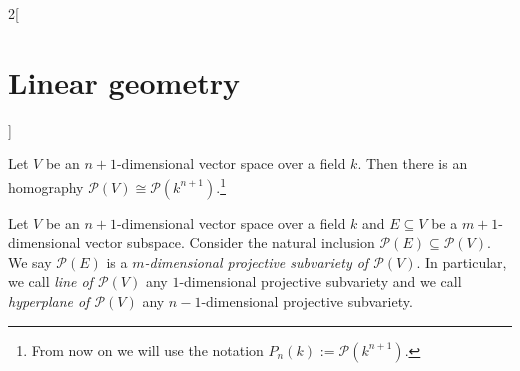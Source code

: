 \documentclass[class=article,10pt,crop=false]{standalone}
\begin{document}
\begin{multicols}{2}[\section{Linear geometry}]
\begin{definition}
\end{definition}
\begin{prop}
Let $V$ be an $n+1$-dimensional vector space over a field $k$. Then there is an homography $\mathcal{P}(V)\cong \mathcal{P}(k^{n+1})$.\footnote{From now on we will use the notation $P_n(k):=\mathcal{P}(k^{n+1})$.}
\end{prop}
\begin{definition}
Let $V$ be an $n+1$-dimensional vector space over a field $k$ and $E\subseteq V$ be a $m+1$-dimensional vector subspace. Consider the natural inclusion $\mathcal{P}(E)\subseteq\mathcal{P}(V)$. We say $\mathcal{P}(E)$ is a \textit{$m$-dimensional projective subvariety of $\mathcal{P}(V)$}. In particular, we call \textit{line of $\mathcal{P}(V)$} any $1$-dimensional projective subvariety and we call \textit{hyperplane of $\mathcal{P}(V)$} any $n-1$-dimensional projective subvariety.
\end{definition}

\end{multicols}
\end{document}
